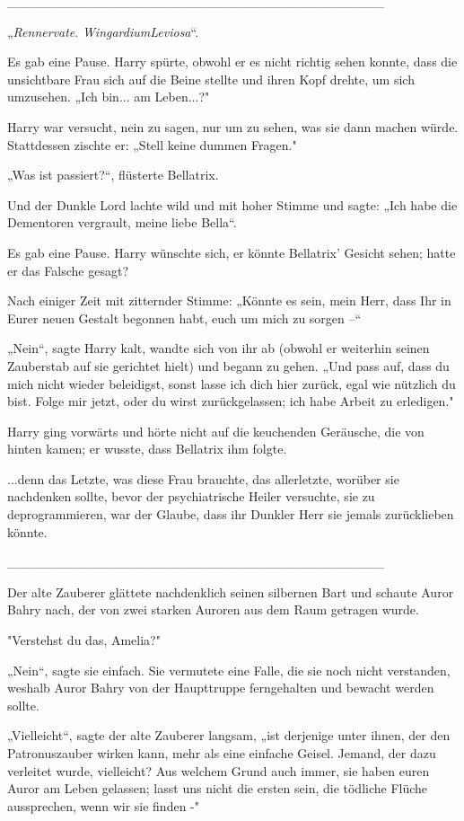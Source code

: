 {\_\_\_\_\_\_\_\_\_\_\_\_\_\_\_\_\_\_\_\_\_\_\_\_\_\_\_\_\_\_\_\_\_\_\_\_\_\_\_\_

„\emph{Rennervate}. \emph{WingardiumLeviosa}“.

Es gab eine Pause. Harry spürte, obwohl er es nicht richtig sehen konnte, dass die unsichtbare Frau sich auf die Beine stellte und ihren Kopf drehte, um sich umzusehen. „Ich bin... am Leben...?"

Harry war versucht, nein zu sagen, nur um zu sehen, was sie dann machen würde. Stattdessen zischte er: „Stell keine dummen Fragen."

„Was ist passiert?“, flüsterte Bellatrix.

Und der Dunkle Lord lachte wild und mit hoher Stimme und sagte: „Ich habe die Dementoren vergrault, meine liebe Bella“.

Es gab eine Pause. Harry wünschte sich, er könnte Bellatrix' Gesicht sehen; hatte er das Falsche gesagt?

Nach einiger Zeit mit zitternder Stimme: „Könnte es sein, mein Herr, dass Ihr in Eurer neuen Gestalt begonnen habt, euch um mich zu sorgen --“

„Nein“, sagte Harry kalt, wandte sich von ihr ab (obwohl er weiterhin seinen Zauberstab auf sie gerichtet hielt) und begann zu gehen. „Und pass auf, dass du mich nicht wieder beleidigst, sonst lasse ich dich hier zurück, egal wie nützlich du bist. Folge mir jetzt, oder du wirst zurückgelassen; ich habe Arbeit zu erledigen."

Harry ging vorwärts und hörte nicht auf die keuchenden Geräusche, die von hinten kamen; er wusste, dass Bellatrix ihm folgte.

...denn das Letzte, was diese Frau brauchte, das allerletzte, worüber sie nachdenken sollte, bevor der psychiatrische Heiler versuchte, sie zu deprogrammieren, war der Glaube, dass ihr Dunkler Herr sie jemals zurücklieben könnte.

\_\_\_\_\_\_\_\_\_\_\_\_\_\_\_\_\_\_\_\_\_\_\_\_\_\_\_\_\_\_\_\_\_\_\_\_\_\_\_\_

Der alte Zauberer glättete nachdenklich seinen silbernen Bart und schaute Auror Bahry nach, der von zwei starken Auroren aus dem Raum getragen wurde.

"Verstehst du das, Amelia?"

„Nein“, sagte sie einfach. Sie vermutete eine Falle, die sie noch nicht verstanden, weshalb Auror Bahry von der Haupttruppe ferngehalten und bewacht werden sollte.

„Vielleicht“, sagte der alte Zauberer langsam, „ist derjenige unter ihnen, der den Patronuszauber wirken kann, mehr als eine einfache Geisel. Jemand, der dazu verleitet wurde, vielleicht? Aus welchem Grund auch immer, sie haben euren Auror am Leben gelassen; lasst uns nicht die ersten sein, die tödliche Flüche aussprechen, wenn wir sie finden -"

}
